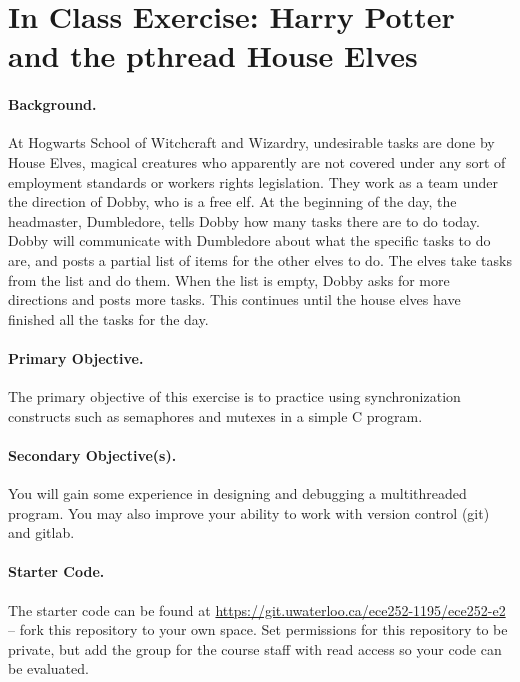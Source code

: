 \documentclass[a4paper]{report}
\newcommand{\termnumeric}{1195}
\begin{document}

\section*{In Class Exercise: Harry Potter and the pthread House Elves}

\paragraph{Background.}
At Hogwarts School of Witchcraft and Wizardry, undesirable tasks are done by House
Elves, magical creatures who apparently are not covered under any sort of employment
standards or workers rights legislation. They work as a team under the direction of
Dobby, who is a free elf. At the beginning of the day, the headmaster, Dumbledore, tells Dobby how many tasks there are to do today. Dobby will communicate with Dumbledore about what the specific tasks to do are, and posts a partial list of items for the other elves to do. The elves take tasks from the list and do them. When the list is empty, Dobby asks for more directions and posts more tasks. This continues until the house elves have finished all the tasks for the day.

\paragraph{Primary Objective.} The primary objective of this exercise is to practice using synchronization constructs such as semaphores and mutexes in a simple C program.

\paragraph{Secondary Objective(s).} You will gain some experience in designing and debugging a multithreaded program. You may also improve your ability to work with version control (git) and gitlab.

\paragraph{Starter Code.} The starter code can be found at \url{https://git.uwaterloo.ca/ece252-\termnumeric/ece252-e2} -- fork this repository to your own space. Set permissions for this repository to be private, but add the group for the course staff with read access so your code can be evaluated.
\end{document}
